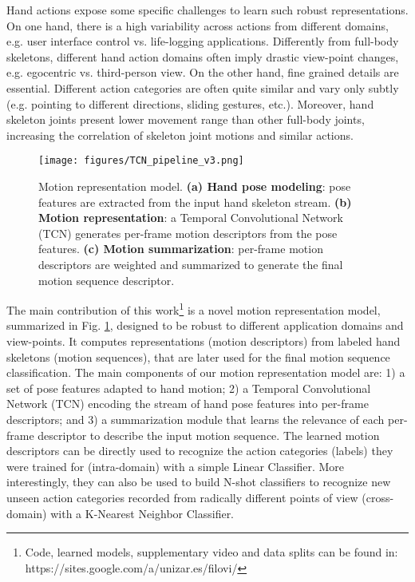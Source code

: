 \documentclass[letterpaper, 10 pt, conference]{ieeeconf}
\begin{document}
Hand actions expose some specific challenges to learn such robust representations. 
On one hand, there is a high variability across actions from different domains, e.g. user interface control vs. life-logging applications. Differently from full-body skeletons, different hand action domains often imply drastic view-point changes, e.g. egocentric vs. third-person view. 
On the other hand, fine grained details are essential. Different action categories are often quite similar and vary only subtly (e.g. pointing to different directions, sliding gestures, etc.). 
Moreover, hand skeleton joints present lower movement range than other full-body joints, increasing the correlation of skeleton joint motions and similar actions.




\begin{figure}[!tb]
    \centering
    \texttt{[image: figures/TCN\_pipeline\_v3.png]}
    \caption{Motion representation model.
    \textbf{(a) Hand pose modeling}: 
pose features are extracted from the input hand skeleton stream.
    \textbf{(b) Motion representation}: 
a Temporal Convolutional Network (TCN) generates per-frame motion descriptors from the pose features.
    \textbf{(c) Motion summarization}: 
per-frame motion descriptors are weighted and summarized to generate the final motion sequence descriptor.
    }
    \label{fig:pipeline}
\end{figure}


The main contribution of this work\footnote{Code, learned models, supplementary video and data splits can be found in: https://sites.google.com/a/unizar.es/filovi/} is a novel motion representation model, summarized in Fig. \ref{fig:pipeline}, designed to be robust to different application domains and view-points. It computes representations (motion descriptors) from labeled hand skeletons (motion sequences), that are later used for the final motion sequence classification.
The main components of our motion representation model are: 1) a set of pose features adapted to hand motion; 2) a Temporal Convolutional Network (TCN) encoding the stream of hand pose features into per-frame descriptors; and 3) a summarization module that learns the relevance of each per-frame descriptor to describe the input motion sequence.  
The learned motion descriptors can be directly used to recognize the action categories (labels) they were trained for (intra-domain) with a simple Linear Classifier. More interestingly, they can also be used to build N-shot classifiers to recognize new unseen action categories recorded from radically different points of view (cross-domain) with a K-Nearest Neighbor Classifier.
\end{document}
